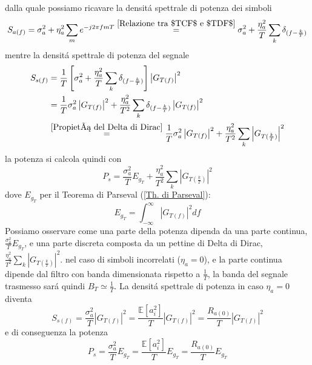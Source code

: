                 dalla quale possiamo ricavare la densitá spettrale di potenza dei simboli
                \[
                    S_{a(f)} = \sigma_a^2 + \eta_a^2\sum_{m}e^{-j2\pi fmT} \overset{\ref{Relazione tra $TCF$ e $TDF$}}{=} \sigma_a^2 + \frac{\eta_a^2 }{T}\sum_{k} \delta_{(f-\frac{k}{T})}
                \]
                mentre la densitá spettrale di potenza del segnale 
                \begin{align}
                    S_{s(f)} &= \frac{1}{T} \left[\sigma_a^2 + \frac{\eta_a^2 }{T}\sum_{k} \delta_{(f-\frac{k}{T})}\right]\left|G_{T(f)}\right|^2 \nonumber \\
                            &= \frac{1}{T} \sigma_a^2\left|G_{T(f)}\right|^2 + \frac{\eta_a^2 }{T^2}\sum_{k} \delta_{(f-\frac{k}{T})}\left|G_{T(f)}\right|^2\nonumber \\
                            &\overset{\ref{Propietá del Delta di Dirac}}{=} \frac{1}{T} \sigma_a^2\left|G_{T(f)}\right|^2 + \frac{\eta_a^2 }{T^2}\sum_{k} \left|G_{T(\frac{k}{T})}\right|^2\nonumber
                \end{align}
                la potenza si calcola quindi con 
                \[
                    P_s  = \frac{\sigma_a^2}{T} E_{g_T} + \frac{\eta_a^2 }{T^2}\sum_{k} \left|G_{T(\frac{k}{T})}\right|^2
                \]
                dove $E_{g_T}$ per il Teorema di Parseval (\ref{Th. di Parseval}):
                \[
                    E_{g_T} = \int_{-\infty}^{\infty} \left|G_{T(f)}\right|^2 df 
                \]
                Possiamo osservare come una parte della potenza dipenda da una parte continua, $\frac{\sigma_a^2}{T} E_{g_T}$, e una parte discreta
                composta da un pettine di Delta di Dirac, $\frac{\eta_a^2 }{T^2}\sum_{k} \left|G_{T(\frac{k}{T})}\right|^2$. nel caso di simboli incorrelati ($\eta_a = 0$),
                e la parte continua dipende dal filtro con banda dimensionata rispetto a $\frac{1}{T}$, la banda del segnale trasmesso sará quindi $B_T \simeq \frac{1}{T}$. 
                La densitá spettrale di potenza in caso $\eta_a = 0$ diventa
                \[
                    S_{s(f)} = \frac{\sigma_a^2}{T} \left|G_{T(f)}\right|^2 =  \frac{\mathbb{E}[a_i^2]}{T} \left|G_{T(f)}\right|^2 = \frac{R_{a(0)}}{T} \left|G_{T(f)}\right|^2
                \] \label{Potenza - PAM}
                e di conseguenza la potenza 
                \[
                    P_s  = \frac{\sigma_a^2}{T} E_{g_T} = \frac{\mathbb{E}[a_i^2]}{T} E_{g_T} = \frac{R_{a(0)}}{T} E_{g_T}
                \]
